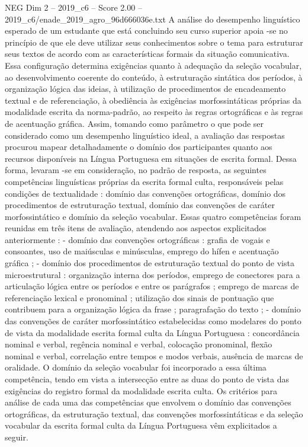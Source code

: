 \begin{textsample}{NEG Dim 2 – 2019\_c6 – Score 2.00 – 2019\_c6/enade\_2019\_agro\_96d666036e.txt}
A análise do desempenho linguístico esperado de um estudante que está concluindo seu curso superior apoia -se no princípio de que ele deve utilizar seus conhecimentos sobre o tema para estruturar seus textos de acordo com as características formais da situação comunicativa.
Essa configuração determina exigências quanto à adequação da seleção vocabular, ao desenvolvimento coerente do conteúdo, à estruturação sintática dos períodos, à organização lógica das ideias, à utilização de procedimentos de encadeamento textual e de referenciação, à obediência às exigências morfossintáticas próprias da modalidade escrita da norma-padrão, ao respeito às regras ortográficas e às regras de acentuação gráfica.
Assim, tomando como parâmetro o que pode ser considerado como um desempenho linguístico ideal, a avaliação das respostas procurou mapear detalhadamente o domínio dos participantes quanto aos recursos disponíveis na Língua Portuguesa em situações de escrita formal.
Dessa forma, levaram -se em consideração, no padrão de resposta, as seguintes competências linguísticas próprias da escrita formal culta, responsáveis pelas condições de textualidade : domínio das convenções ortográficas, domínio dos procedimentos de estruturação textual, domínio das convenções de caráter morfossintático e domínio da seleção vocabular.
Essas quatro competências foram reunidas em três itens de avaliação, atendendo aos aspectos explicitados anteriormente : - domínio das convenções ortográficas : grafia de vogais e consoantes, uso de maiúsculas e minúsculas, emprego do hífen e acentuação gráfica ; - domínio dos procedimentos de estruturação textual do ponto de vista microestrutural : organização interna dos períodos, emprego de conectores para a articulação lógica entre os períodos e entre os parágrafos ; emprego de marcas de referenciação lexical e pronominal ; utilização dos sinais de pontuação que contribuem para a organização lógica da frase ; paragrafação do texto ; - domínio das convenções de caráter morfossintático estabelecidas como modelares do ponto de vista da modalidade escrita formal culta da Língua Portuguesa : concordância nominal e verbal, regência nominal e verbal, colocação pronominal, flexão nominal e verbal, correlação entre tempos e modos verbais, ausência de marcas de oralidade.
O domínio da seleção vocabular foi incorporado a essa última competência, tendo em vista a intersecção entre as duas do ponto de vista das exigências do registro formal da modalidade escrita culta.
Os critérios para análise de cada uma das competências que envolvem o domínio das convenções ortográficas, da estruturação textual, das convenções morfossintáticas e da seleção vocabular da escrita formal culta da Língua Portuguesa vêm explicitados a seguir.

\end{textsample}
